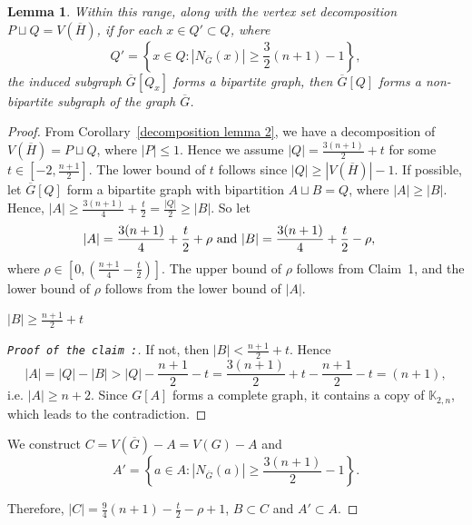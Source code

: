 \documentclass[reqno,10pt]{amsart}
\newtheorem{lemma}[theorem]{Lemma}
\theoremstyle{definition}
\begin{document}
\begin{lemma}\label{nbd conservation 2}
Within this range, along with the vertex set decomposition $P\sqcup Q=V(\overline{H})$, if for each $x\in Q'\subset Q$, where 
\begin{equation*}
Q'=\left\{x\in Q:|N_{\overline{G}}(x)|\geq\frac{3}{2}(n+1)-1\right\},
\end{equation*}
the induced subgraph  $\overline{G}[Q_{x}]$ forms a bipartite graph, then $\overline{G}[Q]$ forms a non-bipartite subgraph of the graph $\overline{G}$.
\end{lemma}
\begin{proof}
From Corollary~\ref{decomposition lemma 2}, we have a decomposition of $V(\overline{H})=P\sqcup Q$, where $|P|\leq 1$. Hence we assume $|Q|=\frac{3(n+1)}{2}+t$ for some $t\in [-2, \frac{n+1}{2}]$. The lower bound of $t$ follows since $|Q|\geq |V(\overline{H})|-1$. If possible, let $\overline{G}[Q]$ form a bipartite graph with bipartition $A\sqcup B=Q$, where $|A|\geq |B|$. Hence, $|A|\geq \frac{3(n+1)}{4}+\frac{t}{2}=\frac{|Q|}{2}\geq|B|$. So let 
\begin{align*}
|A|&=\frac{3(n+1)}{4}+\frac{t}{2}+\rho\textup{ and }|B|=\frac{3(n+1)}{4}+\frac{t}{2}-\rho,
\end{align*}
where  $\rho\in[0,(\frac{n+1}{4}-\frac{t}{2})]$. The upper bound of $\rho$ follows from Claim~1, and the lower bound of $\rho$ follows from the lower bound of $|A|$. 

 $|B|\geq\frac{n+1}{2}+t$
\begin{proof}[\tt{Proof of the claim} :]\renewcommand{\qedsymbol}{}
If not, then $|B|<\frac{n+1}{2}+t$. Hence 
\begin{equation*}
|A|=|Q|-|B|>|Q|-\frac{n+1}{2}-t=\frac{3(n+1)}{2}+t-\frac{n+1}{2}-t=(n+1), 
\end{equation*}
i.e. $|A|\geq n+2$. Since $G[A]$ forms a complete graph, it contains a copy of $\mathbb{K}_{2,n}$, which leads to the contradiction.   	
\end{proof}

We construct $C= V(\overline{G})- A=V(G)-A$ and 
\begin{equation*}
A'=\left\{a\in A:|N_{\overline{G}}(a)|\geq\frac{3(n+1)}{2}-1\right\}.    
\end{equation*}

Therefore, $|C|=\frac{9}{4}(n+1)-\frac{t}{2}-\rho+1$, $B\subset C$ and $A'\subset A$.


\end{proof}
\end{document}
